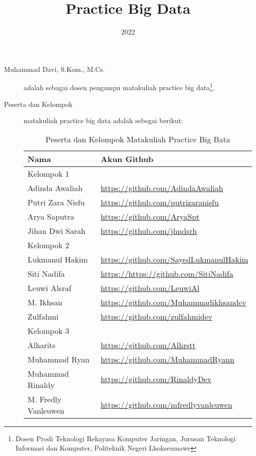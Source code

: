 \documentclass[a4paper]{tufte-handout}
\title{Practice Big Data}
\date{2022}
\begin{document}
\maketitle


\begin{projects}
\begin{description}
\item [Muhammad Davi, S.Kom., M.Cs.] adalah sebagai dosen pengampu matakuliah practice big data\footnote{Dosen Prodi Teknologi Rekayasa Komputer Jaringan, Jurusan Teknologi Informasi dan Komputer, Politeknik Negeri Lhokseumawe}.
\item [Peserta dan Kelompok] matakuliah practice big data adalah sebegai berikut:

\begin{table}[!ht]
\caption{Peserta dan Kelompok Matakuliah Practice Big Bata}
\label{tab:peserta}
\centering
\begin{tabular}{ll} 
\toprule
Nama &	Akun Github\\
\midrule
Kelompok 1\\
\midrule
Adinda Awaliah			& \url{https://github.com/AdindaAwaliah} \\
Putri Zara Nisfu		& \url{https://github.com/putrizaranisfu} \\
Arya Saputra			& \url{https://github.com/AryaSpt} \\
Jihan Dwi Sarah			& \url{https://github.com/jhndsrh} \\
\midrule
Kelompok 2\\
\midrule
Lukmanul Hakim			& \url{https://github.com/SayedLukmanulHakim} \\
Siti Nadifa			& \url{https://https://github.com/SitiNadifa} \\
Leuwi Alsraf		& \url{https://github.com/LeuwiAl} \\
M. Ikhsan				& \url{https://github.com/Muhammadikhsandev} \\
Zulfahmi				& \url{https://github.com/zulfahmidev} \\
\midrule
Kelompok 3\\
\midrule
Alharits			& \url{https://github.com/Alhrstt} \\
Muhammad Ryan			& \url{https://github.com/MuhammadRyann} \\
Muhammad Rinaldy	& \url{https://github.com/RinaldyDev} \\
M. Fredly Vanleuwen			& \url{https://github.com/mfredlyvanleuwen} \\

\end{tabular}
\end{table}
\end{description}
\end{projects}
\end{document}
